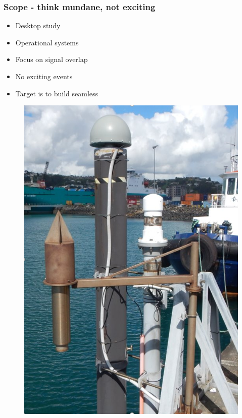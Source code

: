 \begin{frame}
\frametitle{Scope - think mundane, not exciting}
\begin{minipage}{0.45\textwidth}
    \begin{itemize}
        \item Desktop study
        \item Operational systems
        \item Focus on signal overlap
        \item No exciting events
        \item Target is to build seamless 
    \end{itemize}
\end{minipage}
\hfill
\begin{minipage}{0.45\textwidth}
    \begin{figure}      
    \includegraphics[width=\textwidth]{figures/images/tidegaugeEg.png}
    \end{figure}
\end{minipage}
\end{frame}
